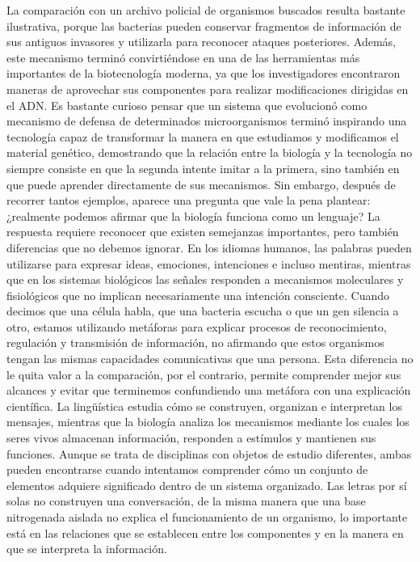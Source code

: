 \documentclass[12pt]{article}
\begin{document}
La comparación con un archivo policial de organismos buscados resulta bastante ilustrativa, porque las bacterias pueden conservar fragmentos de información de sus antiguos invasores y utilizarla para reconocer ataques posteriores. Además, este mecanismo terminó convirtiéndose en una de las herramientas más importantes de la biotecnología moderna, ya que los investigadores encontraron maneras de aprovechar sus componentes para realizar modificaciones dirigidas en el ADN. Es bastante curioso pensar que un sistema que evolucionó como mecanismo de defensa de determinados microorganismos terminó inspirando una tecnología capaz de transformar la manera en que estudiamos y modificamos el material genético, demostrando que la relación entre la biología y la tecnología no siempre consiste en que la segunda intente imitar a la primera, sino también en que puede aprender directamente de sus mecanismos.
Sin embargo, después de recorrer tantos ejemplos, aparece una pregunta que vale la pena plantear: ¿realmente podemos afirmar que la biología funciona como un lenguaje? La respuesta requiere reconocer que existen semejanzas importantes, pero también diferencias que no debemos ignorar. En los idiomas humanos, las palabras pueden utilizarse para expresar ideas, emociones, intenciones e incluso mentiras, mientras que en los sistemas biológicos las señales responden a mecanismos moleculares y fisiológicos que no implican necesariamente una intención consciente. Cuando decimos que una célula habla, que una bacteria escucha o que un gen silencia a otro, estamos utilizando metáforas para explicar procesos de reconocimiento, regulación y transmisión de información, no afirmando que estos organismos tengan las mismas capacidades comunicativas que una persona.
Esta diferencia no le quita valor a la comparación, por el contrario, permite comprender mejor sus alcances y evitar que terminemos confundiendo una metáfora con una explicación científica. La lingüística estudia cómo se construyen, organizan e interpretan los mensajes, mientras que la biología analiza los mecanismos mediante los cuales los seres vivos almacenan información, responden a estímulos y mantienen sus funciones. Aunque se trata de disciplinas con objetos de estudio diferentes, ambas pueden encontrarse cuando intentamos comprender cómo un conjunto de elementos adquiere significado dentro de un sistema organizado. Las letras por sí solas no construyen una conversación, de la misma manera que una base nitrogenada aislada no explica el funcionamiento de un organismo, lo importante está en las relaciones que se establecen entre los componentes y en la manera en que se interpreta la información.
\end{document}

